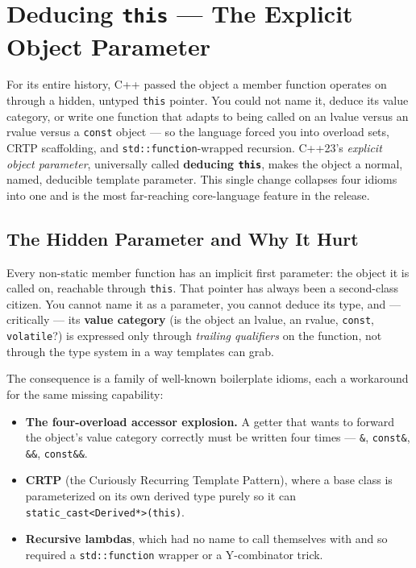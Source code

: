 \chapter{Deducing \texttt{this} --- The Explicit Object Parameter}
\label{ch:deducing-this}

For its entire history, C++ passed the object a member function operates on through a hidden, untyped \lstinline|this| pointer. You could not name it, deduce its value category, or write one function that adapts to being called on an lvalue versus an rvalue versus a \lstinline|const| object --- so the language forced you into overload sets, CRTP scaffolding, and \lstinline|std::function|-wrapped recursion. C++23's \emph{explicit object parameter}, universally called \textbf{deducing \lstinline|this|}, makes the object a normal, named, deducible template parameter. This single change collapses four idioms into one and is the most far-reaching core-language feature in the release.

\section{The Hidden Parameter and Why It Hurt}

Every non-static member function has an implicit first parameter: the object it is called on, reachable through \lstinline|this|. That pointer has always been a second-class citizen. You cannot name it as a parameter, you cannot deduce its type, and --- critically --- its \textbf{value category} (is the object an lvalue, an rvalue, \lstinline|const|, \lstinline|volatile|?) is expressed only through \emph{trailing qualifiers} on the function, not through the type system in a way templates can grab.

The consequence is a family of well-known boilerplate idioms, each a workaround for the same missing capability:

\begin{itemize}
    \item \textbf{The four-overload accessor explosion.} A getter that wants to forward the object's value category correctly must be written four times --- \lstinline|&|, \lstinline|const&|, \lstinline|&&|, \lstinline|const&&|.
    \item \textbf{CRTP} (the Curiously Recurring Template Pattern), where a base class is parameterized on its own derived type purely so it can \lstinline|static_cast<Derived*>(this)|.
    \item \textbf{Recursive lambdas}, which had no name to call themselves with and so required a \lstinline|std::function| wrapper or a Y-combinator trick.
\end{itemize}

